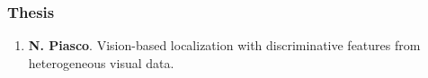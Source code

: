 \begin{publication}
\subsubsection*{Thesis}

\begin{enumerate}\scriptsize
\item \textbf{N. Piasco}. Vision-based localization with discriminative features from heterogeneous visual data.
\end{enumerate}

\end{publication}
